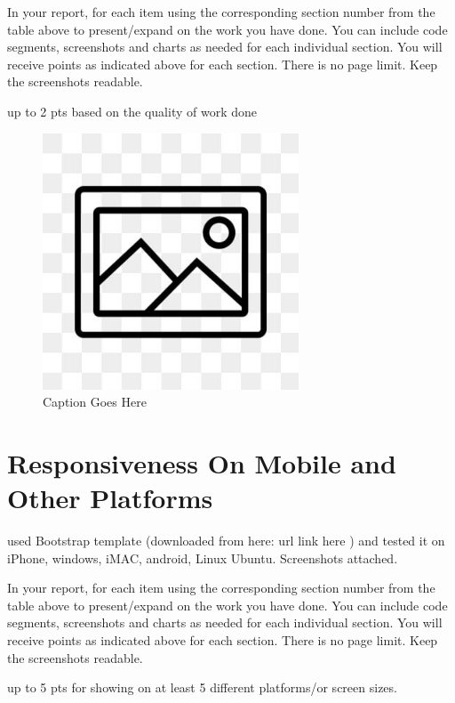 \documentclass[12pt, letterpaper]{article}
\begin{document}
In your report, for each item using the corresponding section number from the table above to present/expand on the work you have done. You can include code segments, screenshots and charts as needed for each individual section. You will receive points as indicated above for each section. There is no page limit. Keep the screenshots readable.

up to 2 pts based on the quality of work done

\begin{figure}[htbp]
	\centering
	\includegraphics[width=3in]{images/placeholder.jpg}
	\caption{Caption Goes Here}
 \end{figure}

 \newpage

\section{Responsiveness On Mobile and Other Platforms}
used Bootstrap template (downloaded from here: url link here ) and tested it on iPhone, windows, iMAC, android, Linux Ubuntu. Screenshots attached.

In your report, for each item using the corresponding section number from the table above to present/expand on the work you have done. You can include code segments, screenshots and charts as needed for each individual section. You will receive points as indicated above for each section. There is no page limit. Keep the screenshots readable.

up to 5 pts for showing on at least 5 different platforms/or screen sizes.
\end{document}
